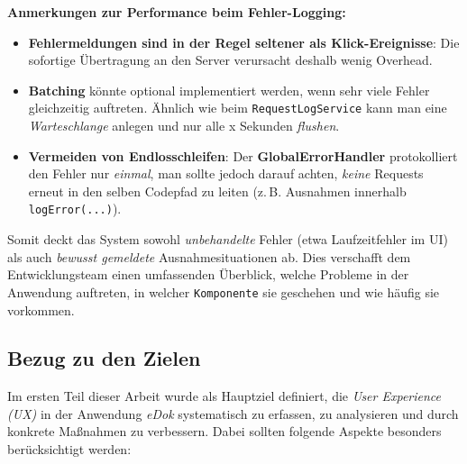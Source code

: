 \documentclass[12pt,oneside]{article}
\begin{document}
\noindent
\textbf{Anmerkungen zur Performance beim Fehler-Logging:}
\begin{itemize}
  \item \textbf{Fehlermeldungen sind in der Regel seltener als Klick-Ereignisse}: Die sofortige Übertragung an den Server verursacht deshalb wenig Overhead.
  \item \textbf{Batching} könnte optional implementiert werden, wenn sehr viele Fehler gleichzeitig auftreten. Ähnlich wie beim \lstinline|RequestLogService| kann man eine \emph{Warteschlange} anlegen und nur alle x Sekunden \emph{flushen}.
  \item \textbf{Vermeiden von Endlosschleifen}: Der \textbf{GlobalErrorHandler} protokolliert den Fehler nur \emph{einmal}, man sollte jedoch darauf achten, \emph{keine} Requests erneut in den selben Codepfad zu leiten (z.\,B. Ausnahmen innerhalb \lstinline|logError(...)|).
\end{itemize}

\noindent
Somit deckt das System sowohl \emph{unbehandelte} Fehler (etwa Laufzeitfehler im UI) als auch \emph{bewusst gemeldete} Ausnahmesituationen ab. Dies verschafft dem Entwicklungsteam einen umfassenden Überblick, welche Probleme in der Anwendung auftreten, in welcher \texttt{Komponente} sie geschehen und wie häufig sie vorkommen.


 
 

 \subsection{Bezug zu den Zielen}
Im ersten Teil dieser Arbeit wurde als Hauptziel definiert, die \emph{User Experience (UX)} in der Anwendung \textit{eDok} systematisch zu erfassen, zu analysieren und durch konkrete Maßnahmen zu verbessern. Dabei sollten folgende Aspekte besonders berücksichtigt werden:
\end{document}
